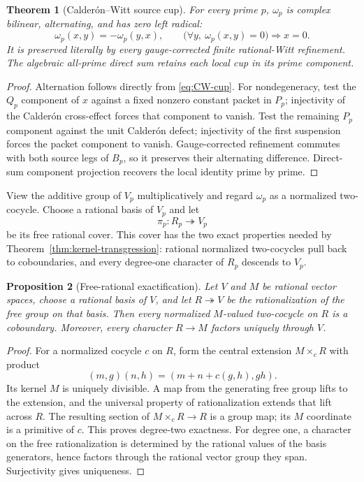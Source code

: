 \documentclass[11pt]{article}
\newtheorem{theorem}{Theorem}[section]
\newtheorem{proposition}[theorem]{Proposition}
\theoremstyle{definition}
\theoremstyle{remark}
\numberwithin{equation}{section}
\begin{document}
\begin{theorem}[Calder\'on--Witt source cup]
\label{thm:CW-cup}
For every prime $p$, $\omega_p$ is complex bilinear, alternating, and has
zero left radical:
\[
 \omega_p(x,y)=-\omega_p(y,x),\qquad
 \bigl(\forall y,\ \omega_p(x,y)=0\bigr)\Longrightarrow x=0.
\]
It is preserved literally by every gauge-corrected finite rational-Witt
refinement.  The algebraic all-prime direct sum retains each local cup in
its prime component.
\end{theorem}

\begin{proof}
Alternation follows directly from \eqref{eq:CW-cup}.  For nondegeneracy,
test the $Q_p$ component of $x$ against a fixed nonzero constant packet in
$P_p$; injectivity of the Calder\'on cross-effect forces that component to
vanish.  Test the remaining $P_p$ component against the unit Calder\'on
defect; injectivity of the first suspension forces the packet component to
vanish.  Gauge-corrected refinement commutes with both source legs of
$B_p$, so it preserves their alternating difference.  Direct-sum component
projection recovers the local identity prime by prime.
\end{proof}

View the additive group of $V_p$ multiplicatively and regard $\omega_p$ as
a normalized two-cocycle.  Choose a rational basis of $V_p$ and let
\[
                       \pi_p:R_p\twoheadrightarrow V_p
\]
be its free rational cover.  This cover has the two exact properties needed
by Theorem~\ref{thm:kernel-transgression}: rational normalized
two-cocycles pull back to coboundaries, and every degree-one character of
$R_p$ descends to $V_p$.

\begin{proposition}[Free-rational exactification]
\label{prop:free-rational}
Let $V$ and $M$ be rational vector spaces, choose a rational basis of $V$,
and let $R\twoheadrightarrow V$ be the rationalization of the free group on
that basis.  Then every normalized $M$-valued two-cocycle on $R$ is a
coboundary.  Moreover, every character $R\to M$ factors uniquely through
$V$.
\end{proposition}

\begin{proof}
For a normalized cocycle $c$ on $R$, form the central extension
$M\times_cR$ with product
\[
                 (m,g)(n,h)=(m+n+c(g,h),gh).
\]
Its kernel $M$ is uniquely divisible.  A map from the generating free group
lifts to the extension, and the universal property of rationalization
extends that lift across $R$.  The resulting section of
$M\times_cR\to R$ is a group map; its $M$ coordinate is a primitive of
$c$.  This proves degree-two exactness.  For degree one, a character on the
free rationalization is determined by the rational values of the basis
generators, hence factors through the rational vector group they span.
Surjectivity gives uniqueness.
\end{proof}
\end{document}
